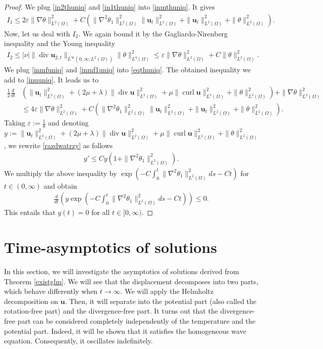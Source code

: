 \documentclass[11pt]{article}
\numberwithin{equation}{section}
\theoremstyle{plain}
\newcommand\bb[1]{\mathbf{#1}}
\newcommand{\tn}{\Omega}
\newcommand{\ld}{L^2(\Omega)}
\newcommand{\ul}{\frac{1}{2}}
\newcommand{\ddt}{\frac{d}{dt}}
\renewcommand{\div}{\operatorname{div}}
\DeclareMathOperator{\curl}{curl}
\let \epsilon\varepsilon
\newcommand{\wspnd}{2\mu+\lambda}
\newcommand{\bu}{\bb{u}}
\begin{document}
\begin{proof}
We plug \eqref{in2thuniq} and \eqref{in1thuniq} into \eqref{inmthuniq}. It gives
\begin{align}\label{inmfuniq}
I_1\leq 2\epsilon\|\nabla\theta\|_{\ld}^2+ C(\|\nabla^2\theta_1\|_{\ld}^2\|\bb u_t\|_{\ld}^2+\|\bb u_t\|_{\ld}^2+\|\theta\|_{\ld}^2).
\end{align}
Now, let us deal with $I_2$. We again bound it by the Gagliardo-Nirenberg inequality and the Young inequality
\begin{align}\label{inmf1uniq}
I_2\leq |\nu|\|\div\bb u_{2,t}\|_{L^{\infty}(0,\infty;\ld)}\|\theta\|_{L^4(\tn)}^2\leq \epsilon\|\nabla\theta\|^2_{\ld}+C\|\theta\|_{\ld}^2.
\end{align}
We plug \eqref{inmfuniq} and \eqref{inmf1uniq} into \eqref{eqthuniq}. The obtained inequality we add to \eqref{inuuniq}. It leads us to
\begin{align}\label{razdwatrzy}
\nonumber\ul\ddt&\left(\|\bb u_t\|^2_{\ld}+(\wspnd)\|\div\bb u\|_{\ld}^2+\mu\|\curl\bu\|_{\ld}^2+\|\theta\|^2_{\ld}\right)+\|\nabla\theta\|_{\ld}^2
\\ &\leq4\epsilon\|\nabla\theta\|_{\ld}^2+ C(\|\nabla^2\theta_1\|_{\ld}^2\|\bb u_t\|_{\ld}^2+\|\bb u_t\|_{\ld}^2+\|\theta\|_{\ld}^2).
\end{align}
Taking $\epsilon:=\frac18$ and denoting $y:=\|\bb u_t\|^2_{\ld}+(\wspnd)\|\div\bb u\|_{\ld}^2+\mu\|\curl\bb u\|_{\ld}^2+\|\theta\|^2_{\ld}$, we rewrite \eqref{razdwatrzy} as follows
\begin{align*}
y'\leq C y(1+\|\nabla^2\theta_1\|_{\ld}^2).
\end{align*}
We multiply the above inequality by $\operatorname{exp}\left(-C\int_0^t\|\nabla^2\theta_1\|_{\ld}^2ds-Ct\right)$ for $t\in(0,\infty)$ and obtain
\begin{align*}
\ddt\left(y \operatorname{exp}\left(-C\int_0^t\|\nabla^2\theta_1\|_{\ld}^2ds-Ct\right)\right)\leq 0.
\end{align*}
This entails that $y(t)=0$ for all $t\in [0,\infty)$.
\end{proof}

\section{Time-asymptotics of solutions}\label{czwarta}
In this section, we will investigate the asymptotics of solutions derived from Theorem \ref{existglm}. We will see that the displacement decomposes into two parts, which behave differently when $t\to\infty$. We will apply the Helmholtz decomposition on $\bu$. Then, it will separate into the potential part (also called the rotation-free part) and the divergence-free part. It turns out that the divergence-free part can be considered completely independently of the temperature and the potential part. Indeed, it will be shown that it satisfies the homogeneous wave equation. Consequently, it oscillates indefinitely.
\end{document}
